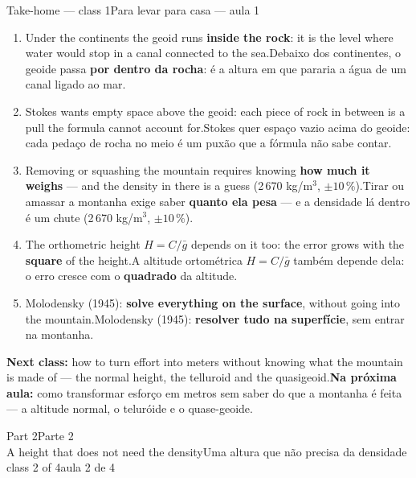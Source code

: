 \documentclass[aspectratio=169,11pt]{beamer}
\newcommand{\tr}[2]{\ifEN#2\else#1\fi}
\newcommand{\bnum}[1]{\textbf{\textcolor{mTeal}{#1}}}
\begin{document}
\begin{frame}{\tr{Para levar para casa --- aula 1}{Take-home --- class 1}}
  \small
  \begin{enumerate}
    \setlength{\itemsep}{2pt}
    \item \tr{Debaixo dos continentes, o geoide passa \bnum{por dentro da rocha}: é a altura em
          que pararia a água de um canal ligado ao mar.}{Under the continents the geoid runs
          \bnum{inside the rock}: it is the level where water would stop in a canal connected
          to the sea.}
    \item \tr{Stokes quer \alert{espaço vazio} acima do geoide: cada pedaço de rocha no meio é
          um puxão que a fórmula não sabe contar.}{Stokes wants \alert{empty space} above the
          geoid: each piece of rock in between is a pull the formula cannot account for.}
    \item \tr{Tirar ou amassar a montanha exige saber \bnum{quanto ela pesa} --- e a densidade
          lá dentro é um chute (2\,670 kg/m$^3$, $\pm 10\,\%$).}{Removing or squashing the
          mountain requires knowing \bnum{how much it weighs} --- and the density in there is a
          guess (2\,670 kg/m$^3$, $\pm 10\,\%$).}
    \item \tr{A altitude ortométrica $H = C/\bar g$ também depende dela: o erro cresce com o
          \bnum{quadrado} da altitude.}{The orthometric height $H = C/\bar g$ depends on it
          too: the error grows with the \bnum{square} of the height.}
    \item \tr{Molodensky (1945): \bnum{resolver tudo na superfície}, sem entrar na
          montanha.}{Molodensky (1945): \bnum{solve everything on the surface}, without going
          into the mountain.}
  \end{enumerate}
  \begin{ideia}
    \scriptsize \tr{\textbf{Na próxima aula:} como transformar esforço em metros sem saber do
    que a montanha é feita --- a altitude normal, o teluróide e o quase-geoide.}{\textbf{Next
    class:} how to turn effort into meters without knowing what the mountain is made of ---
    the normal height, the telluroid and the quasigeoid.}
  \end{ideia}
\end{frame}

\begin{frame}[standout]
  \tr{Parte 2}{Part 2}\\[6pt]
  {\normalsize \tr{Uma altura que não precisa da densidade}{A height that does not need the
  density}}\\[4pt]
  {\scriptsize \tr{aula 2 de 4}{class 2 of 4}}
\end{frame}
\end{document}
